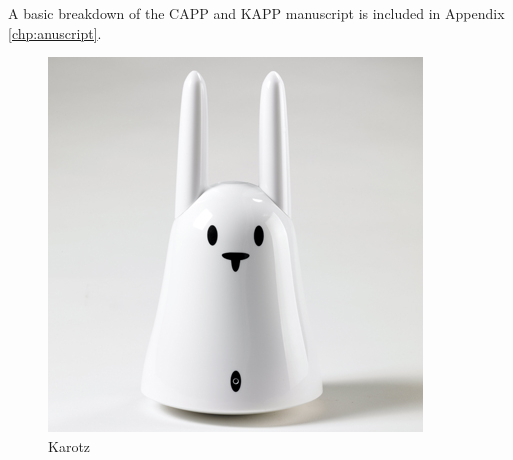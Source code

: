 A basic breakdown of the CAPP and KAPP manuscript is included in Appendix \ref{chp:anuscript}. 


\begin{figure}[H]
	\begin{minipage}[b]{0.4\linewidth}
		\centering
			\includegraphics[width=0.20\paperwidth]{Pictures/karotz.jpg}
		\caption{Karotz}
		\label{fig:karotz}
	\end{minipage}
	\hspace{3cm}
	\begin{minipage}[b]{0.4\linewidth}
	\centering

\end{minipage}
\end{figure}
